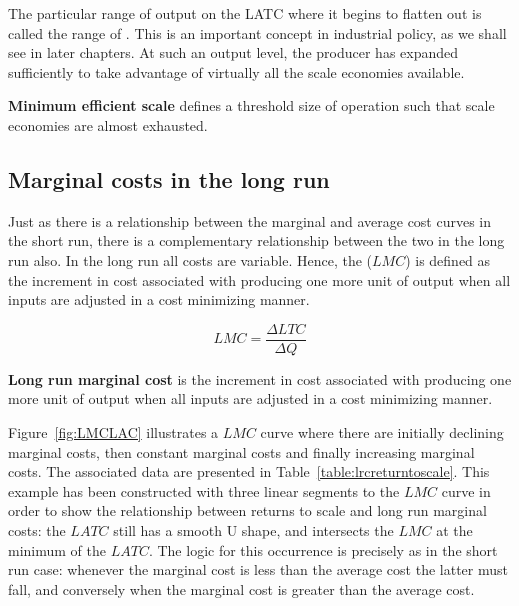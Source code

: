 The particular range of output on the LATC where it begins to flatten out is called the range of . This is an important concept in industrial policy, as we shall see in later chapters. At such an output level, the producer has expanded sufficiently to take advantage of virtually all the scale economies available.

\begin{DefBox}
\textbf{Minimum efficient scale} defines a threshold size of operation such that scale economies are almost exhausted.
\end{DefBox}

\subsection*{Marginal costs in the long run}

Just as there is a relationship between the marginal and average cost curves in the short run, there is a complementary relationship between the two in the long run also. In the long run all costs are variable. Hence, the  ($LMC$) is defined as the increment in cost associated with producing one more unit of output when all inputs are adjusted in a cost minimizing manner. 

\begin{equation*}
LMC=\frac{\Delta LTC}{\Delta Q}
\end{equation*}

\begin{DefBox}
\textbf{Long run marginal cost} is the increment in cost associated with producing one more unit of output when all inputs are adjusted in a cost minimizing manner.
\end{DefBox}

Figure~\ref{fig:LMCLAC} illustrates a $LMC$ curve where there are initially declining marginal costs, then constant marginal costs and finally increasing marginal costs.  The associated data are presented in Table~\ref{table:lrcreturntoscale}. This example has been constructed with three linear segments to the $LMC$ curve in order to show the relationship between returns to scale and long run marginal costs: the $LATC$ still has a smooth U shape, and intersects the $LMC$ at the minimum of the $LATC$. The logic for this occurrence is precisely as in the short run case: whenever the marginal cost is less than the average cost the latter must fall, and conversely when the marginal cost is greater than the average cost. 

